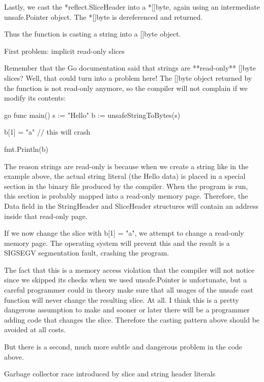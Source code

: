         Lastly, we cast the *reflect.SliceHeader into a *[]byte, again using an intermediate unsafe.Pointer object. The
        *[]byte is dereferenced and returned.

        Thus the function is casting a string into a []byte object.


        First problem: implicit read-only slices

        Remember that the Go documentation said that strings
        are **read-only** []byte slices? Well, that could turn into a problem here! The []byte object returned by the
        function is not read-only anymore, so the compiler will not complain if we modify its contents:

        go
        func main()
        s := "Hello"
        b := unsafeStringToBytes(s)

        b[1] = "a" // this will crash

        fmt.Println(b)



        The reason strings are read-only is because when we create a string like in the example above, the actual string literal
        (the Hello data) is placed in a special section in the binary file produced by the compiler. When the program is run,
        this section is probably mapped into a read-only memory page. Therefore, the Data field in the StringHeader and
        SliceHeader structures will contain an address inside that read-only page.

        If we now change the slice with b[1] = "a", we attempt to change a read-only memory page. The operating system will
        prevent this and the result is a SIGSEGV segmentation fault, crashing the program.

        The fact that this is a memory access violation that the compiler will not notice since we skipped its checks when we
        used unsafe.Pointer is unfortunate, but a careful programmer could in theory make sure that all usages of the unsafe
        cast function will never change the resulting slice. At all. I think this is a pretty dangerous assumption to make and
        sooner or later there will be a programmer adding code that changes the slice. Therefore the casting pattern above
        should be avoided at all costs.

        But there is a second, much more subtle and dangerous problem in the code above.


        Garbage collector race introduced by slice and string header literals

